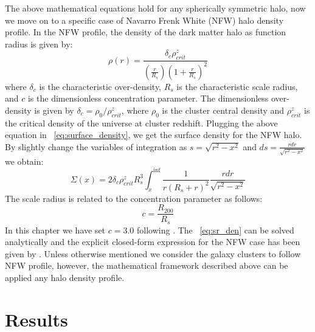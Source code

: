  The above mathematical equations hold for any spherically symmetric halo, now we move on to a specific case of Navarro Frenk White (NFW) halo density profile.
 In the NFW profile, the density of the dark matter halo as function radius is given by:
 \begin{equation}
 \rho(r)= \frac{\delta_{c}\rho^{z}_{crit}}{(\frac{r}{R_{s}})(1+\frac{r}{R_{s}})^{2}}
 \end{equation}
 where $\delta_{c}$ is the characteristic over-density, $R_{s}$ is the characteristic scale radius, and $c$ is the dimensionless concentration parameter.
 The dimensionless over-density is given by $\delta_{c} = \rho_{0}/\rho^{z}_{crit}$, where $\rho_{0}$ is the cluster central density and  $\rho^{z}_{crit}$  is the critical density of the universe at cluster redshift.
 Plugging the above equation in ~\ref{eq:surface_density}, we get the surface density for the NFW halo. 
 By slightly change the variables of integration as $s=\sqrt{r^{2} - x^{2}}$ and $ds = \frac{rdr}{\sqrt{r^{2} - x^{2}}}$ we obtain:
 \begin{equation}
 \Sigma(x) = 2\delta_{c} \rho^{z}_{crit} R^{3}_{s} \int^{\inf}_{x} \frac{1}{r(R_{s} + r)^{2}} \frac{rdr}{\sqrt{r^{2} - x^{2}}}
 \label{eq:sr_den}
 \end{equation}
 The scale radius is related to the concentration parameter as follows:
 \begin{equation}
 c = \frac{R_{200}}{R_{s}}
 \end{equation}
 In this chapter we have set $c = 3.0$ following \cite{bhattacharya13}.
 The ~\ref{eq:sr_den} can be solved analytically and the explicit closed-form expression for the NFW case has been given by \cite{bartelmann96}.
 Unless otherwise mentioned we consider the galaxy clusters to follow NFW profile, however,  the mathematical framework described above can be applied any halo density profile. 
 
 
 \section{Results}

